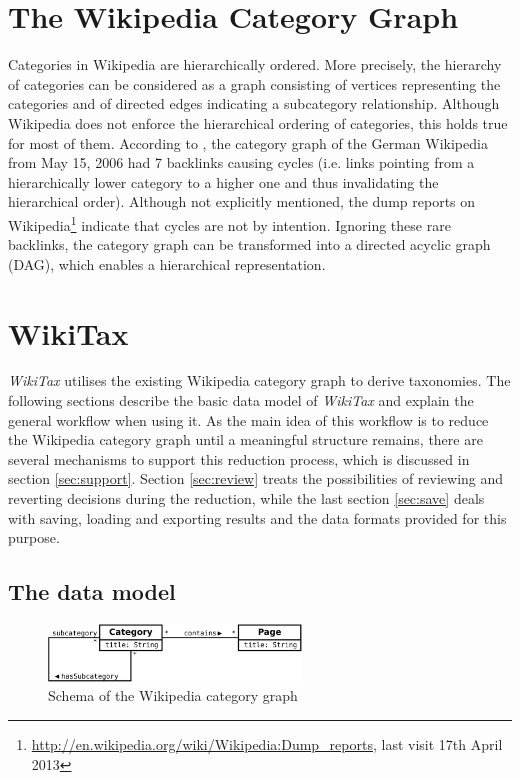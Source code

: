 \documentclass{scrartcl}
\begin{document}
\section{The Wikipedia Category Graph}
\label{sec:category_graph}
Categories in Wikipedia are hierarchically ordered. More precisely, the hierarchy of categories can be considered as a graph consisting of vertices representing the categories and of directed edges indicating a subcategory relationship. Although Wikipedia does not enforce the hierarchical ordering of categories, this holds true for most of them. According to \cite{ZeschGurevych2007analysis}, the category graph of the German Wikipedia from May 15, 2006 had 7 backlinks causing cycles (i.e. links pointing from a hierarchically lower category to a higher one and thus invalidating the hierarchical order). Although not explicitly mentioned, the dump reports on Wikipedia\footnote{\url{http://en.wikipedia.org/wiki/Wikipedia:Dump_reports}, last visit 17th April 2013} indicate that cycles are not by intention. Ignoring these rare backlinks, the category graph can be transformed into a directed acyclic graph (DAG), which enables a hierarchical representation.

\section{WikiTax}
\label{sec:wiki_tax}
\textit{WikiTax} utilises the existing Wikipedia category graph to derive taxonomies. The following sections describe the basic data model of \emph{WikiTax} and explain the general workflow when using it. As the main idea of this workflow is to reduce the Wikipedia category graph until a meaningful structure remains, there are several mechanisms to support this reduction process, which is discussed in section \ref{sec:support}. Section \ref{sec:review} treats the possibilities of reviewing and reverting decisions during the reduction, while the last section \ref{sec:save} deals with saving, loading and exporting results and the data formats provided for this purpose.

\subsection{The data model}

\begin{figure}[htb]
\centering
\includegraphics[width=0.6\textwidth]{figures/simple_schema.pdf} 
\caption{Schema of the Wikipedia category graph}
\label{fig:simple_schema}
\end{figure}
\end{document}
